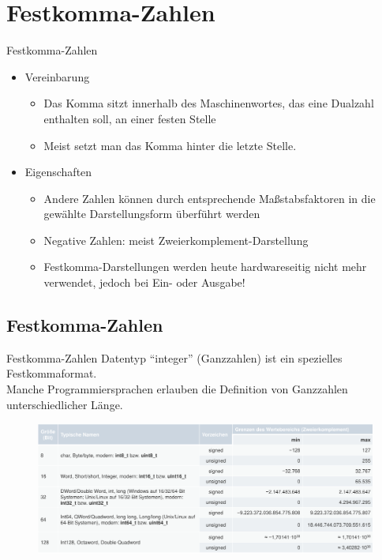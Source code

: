 \documentclass[12pt%
,aspectratio=169%
]{beamer}
\begin{document}
\section{Festkomma-Zahlen}
\begin{frame}{Festkomma-Zahlen}
\begin{itemize}
	\item Vereinbarung
	\begin{itemize}
		\item Das Komma sitzt innerhalb des Maschinenwortes, das eine Dualzahl enthalten soll, an einer festen Stelle	
		\item Meist setzt man das Komma hinter die letzte Stelle.
	\end{itemize}
	\item Eigenschaften
	\begin{itemize}
		\item Andere Zahlen können durch entsprechende Maßstabsfaktoren in die gewählte Darstellungsform überführt werden
		\item Negative Zahlen: meist Zweierkomplement-Darstellung
		\item Festkomma-Darstellungen werden heute hardwareseitig nicht mehr verwendet, jedoch bei Ein- oder Ausgabe!
	\end{itemize}
\end{itemize}
\end{frame}

\subsection{Festkomma-Zahlen}
\begin{frame}{Festkomma-Zahlen}
Datentyp \enquote{integer} (Ganzzahlen) ist ein spezielles Festkommaformat.\\
Manche Programmiersprachen erlauben die Definition von Ganzzahlen unterschiedlicher Länge.
\begin{figure}
\center
\includegraphics[scale=0.25]{pictures/types}
\end{figure}
\end{frame}
\end{document}
